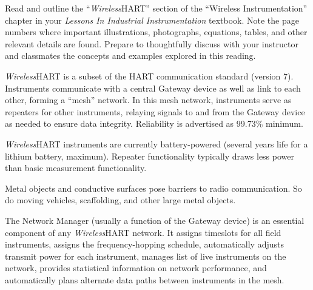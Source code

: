

Read and outline the ``{\sl Wireless}HART'' section of the ``Wireless Instrumentation'' chapter in your {\it Lessons In Industrial Instrumentation} textbook.  Note the page numbers where important illustrations, photographs, equations, tables, and other relevant details are found.  Prepare to thoughtfully discuss with your instructor and classmates the concepts and examples explored in this reading.














{\sl Wireless}HART is a subset of the HART communication standard (version 7).  Instruments communicate with a central Gateway device as well as link to each other, forming a ``mesh'' network.  In this mesh network, instruments serve as repeaters for other instruments, relaying signals to and from the Gateway device as needed to ensure data integrity.  Reliability is advertised as 99.73\% minimum.

\vskip 10pt

{\sl Wireless}HART instruments are currently battery-powered (several years life for a lithium battery, maximum).  Repeater functionality typically draws less power than basic measurement functionality.

\vskip 10pt

Metal objects and conductive surfaces pose barriers to radio communication.  So do moving vehicles, scaffolding, and other large metal objects.

\vskip 10pt

The Network Manager (usually a function of the Gateway device) is an essential component of any {\sl Wireless}HART network.  It assigns timeslots for all field instruments, assigns the frequency-hopping schedule, automatically adjusts transmit power for each instrument, manages list of live instruments on the network, provides statistical information on network performance, and automatically plans alternate data paths between instruments in the mesh.

